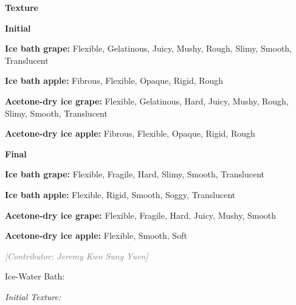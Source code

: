 \documentclass[12pt, a4paper]{article}
\newcommand{\contributor}[1]{\vspace{4pt}\noindent\textcolor{gray}{\small\textit{[Contributor: #1]}}\vspace{2pt}}
\begin{document}

\textbf{Texture}

\textbf{Initial}

\textbf{Ice bath grape:} Flexible, Gelatinous, Juicy, Mushy, Rough,
Slimy, Smooth, Translucent

\textbf{Ice bath apple:} Fibrous, Flexible, Opaque, Rigid, Rough

\textbf{Acetone-dry ice grape:} Flexible, Gelatinous, Hard, Juicy,
Mushy, Rough, Slimy, Smooth, Translucent

\textbf{Acetone-dry ice apple:} Fibrous, Flexible, Opaque, Rigid, Rough

\textbf{Final}

\textbf{Ice bath grape:} Flexible, Fragile, Hard, Slimy, Smooth,
Translucent

\textbf{Ice bath apple:} Flexible, Rigid, Smooth, Soggy, Translucent

\textbf{Acetone-dry ice grape:} Flexible, Fragile, Hard, Juicy, Mushy,
Smooth

\textbf{Acetone-dry ice apple:} Flexible, Smooth, Soft


\contributor{Jeremy Kwo Sung Yuen}


Ice-Water Bath:

\textit{Initial Texture:}
\end{document}

